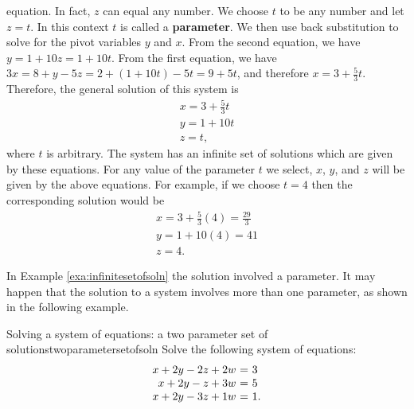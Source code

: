 \begin{solution}
  equation. In fact, $z$ can equal any number. We choose $t$ to be any
  number and let $z = t$.  In this context $t$ is called a
  \textbf{parameter}. We then use back substitution
  to solve for the pivot variables $y$ and $x$. From the second
  equation, we have $y = 1+10z = 1+10t$. From the first equation, we
  have $3x = 8+y-5z = 2+(1+10t)-5t = 9+5t$, and therefore
  $x=3+\frac{5}{3}t$. Therefore, the general solution of this system
  is
  \[
    \begin{array}{l}
      x=3+\frac{5}{3}t \\
      y=1+10t \\
      z=t,
    \end{array}
  \]
  where $t$ is arbitrary. The system has an infinite set of solutions
  which are given by these equations. For any value of the parameter
  $t$ we select, $x$, $y$, and $z$ will be given by the above
  equations. For example, if we choose $t=4$ then the corresponding
  solution would be
  \[
    \begin{array}{l}
      x = 3 + \frac{5}{3}(4) = \frac{29}{3}\\
      y = 1+10(4) = 41 \\
      z = 4.
    \end{array}
  \]
\end{solution}

In Example \ref{exa:infinitesetofsoln} the solution involved a
parameter. It may happen that the solution to a system involves more
than one parameter, as shown in the following example.

\begin{example}{Solving a system of equations: a two parameter set of solutions}{twoparametersetofsoln}
  Solve the following system of equations:
  \begin{equation*}
    \begin{array}{r@{~}c@{~}l}
      x +2y  -2z  +2w &=& 3 \\
      x +2y  -z   +3w &=& 5 \\
      x +2y  -3z  +1w &=& 1.
    \end{array}
  \end{equation*}
\end{example}

